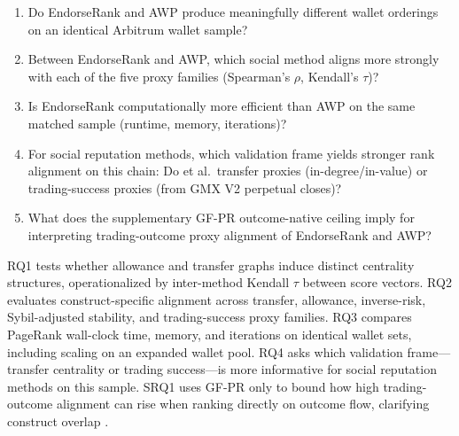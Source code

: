 \begin{enumerate}
\item[\textbf{RQ1.}] Do EndorseRank and AWP produce meaningfully different wallet orderings on an identical Arbitrum wallet sample?
\item[\textbf{RQ2.}] Between EndorseRank and AWP, which social method aligns more strongly with each of the five proxy families (Spearman's $\rho$, Kendall's $\tau$)?
\item[\textbf{RQ3.}] Is EndorseRank computationally more efficient than AWP on the same matched sample (runtime, memory, iterations)?
\item[\textbf{RQ4.}] For social reputation methods, which validation frame yields stronger rank alignment on this chain: Do et al.\ transfer proxies (in-degree/in-value) or trading-success proxies (from GMX V2 perpetual closes)?
\item[\textbf{SRQ1.}] What does the supplementary GF-PR outcome-native ceiling imply for interpreting trading-outcome proxy alignment of EndorseRank and AWP?
\end{enumerate}

RQ1 tests whether allowance and transfer graphs induce distinct centrality structures, operationalized by inter-method Kendall $\tau$ between score vectors. RQ2 evaluates construct-specific alignment across transfer, allowance, inverse-risk, Sybil-adjusted stability, and trading-success proxy families. RQ3 compares PageRank wall-clock time, memory, and iterations on identical wallet sets, including scaling on an expanded wallet pool. RQ4 asks which validation frame---transfer centrality or trading success---is more informative for social reputation methods on this sample. SRQ1 uses GF-PR only to bound how high trading-outcome alignment can rise when ranking directly on outcome flow, clarifying construct overlap .


